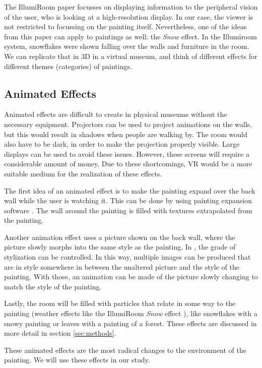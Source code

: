 \documentclass[a4paper]{article}
\begin{document}
The IllumiRoom paper \cite{illumiroom} focusses on displaying information to the peripheral vision of the user, who is looking at a high-resolution display. In our case, the viewer is not restricted to focussing on the painting itself. Nevertheless, one of the ideas from this paper can apply to paintings as well: the \emph{Snow} effect. In the Illumiroom system, snowflakes were shown falling over the walls and furniture in the room. We can replicate that in 3D in a virtual museum, and think of different effects for different themes (categories) of paintings.

\subsection{Animated Effects}

Animated effects are difficult to create in physical museums without the necessary equipment. Projectors can be used to project animations on the walls, but this would result in shadows when people are walking by. The room would also have to be dark, in order to make the projection properly visible. Large displays can be used to avoid these issues. However, these screens will require a considerable amount of money. Due to these shortcomings, VR would be a more suitable medium for the realization of these effects. 

The first idea of an animated effect is to make the painting expand over the back wall while the user is watching it. This can be done by using painting expansion software \cite{inpainting}. The wall around the painting is filled with textures extrapolated from the painting.

Another animation effect uses a picture shown on the back wall, where the picture slowly morphs into the same style as the painting. In \cite{gatys}, the grade of stylization can be controlled. In this way, multiple images can be produced that are in style somewhere in between the unaltered picture and the style of the painting. With those, an animation can be made of the picture slowly changing to match the style of the painting.

Lastly, the room will be filled with particles that relate in some way to the painting (weather effects like the IllumiRoom \emph{Snow} effect \cite{illumiroom}), like snowflakes with a snowy painting or leaves with a painting of a forest. These effects are discussed in more detail in section \ref{sec:methods}.

These animated effects are the most radical changes to the environment of the painting. We will use these effects in our study.
\end{document}
